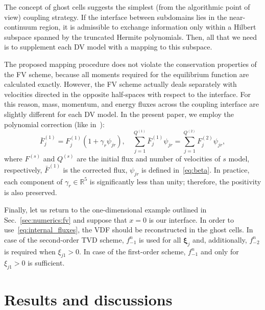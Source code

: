 \documentclass[]{elsarticle} %
\newcommand{\bxi}{\boldsymbol{\xi}}
\begin{document}
The concept of ghost cells suggests the simplest (from the algorithmic point of view) coupling strategy.
If the interface between subdomains lies in the near-continuum region,
it is admissible to exchange information only within a Hilbert subspace
spanned by the truncated Hermite polynomials.
Then, all that we need is to supplement each DV model with a mapping to this subspace.

The proposed mapping procedure does not violate the conservation properties of the FV scheme,
because all moments required for the equilibrium function are calculated exactly.
However, the FV scheme actually deals separately with velocities
directed in the opposite half-spaces with respect to the interface.
For this reason, mass, momentum, and energy fluxes across the coupling interface
are slightly different  for each DV model.
In the present paper, we employ the polynomial correction (like in~\cite{Aristov1980}):
\begin{equation}\label{eq:poly_correction}
    \bar{F}^{(1)}_j = F^{(1)}_j(1+\gamma_r\psi_{j r}), \quad
    \sum_{j=1}^{Q^{(1)}} \bar{F}^{(1)}_j\psi_{j r} = \sum_{j=1}^{Q^{(2)}} F^{(2)}_j\psi_{j r},
\end{equation}
where \(F^{(s)}\) and \(Q^{(s)}\) are the initial flux and number of velocities of \(s\) model, respectively,
\(\bar{F}^{(1)}\) is the corrected flux, \(\psi_{j r}\) is defined in~\eqref{eq:beta}.
In practice, each component of \(\gamma_r\in\mathbb{R}^5\) is significantly less than unity;
therefore, the positivity is also preserved.

Finally, let us return to the one-dimensional example outlined in Sec.~\ref{sec:numerics:fv}
and suppose that \(x=0\) is our interface.
In order to use~\eqref{eq:internal_fluxes}, the VDF should be reconstructed in the ghost cells.
In case of the second-order TVD scheme, \(f_{-1}^n\) is used for all \(\bxi_j\) and, additionally,
\(f_{-2}^n\) is required when \(\xi_{j1}>0\).
In case of the first-order scheme, \(f_{-1}^n\) and only for \(\xi_{j1}>0\) is sufficient.

\section{Results and discussions}\label{sec:results}
\end{document}
